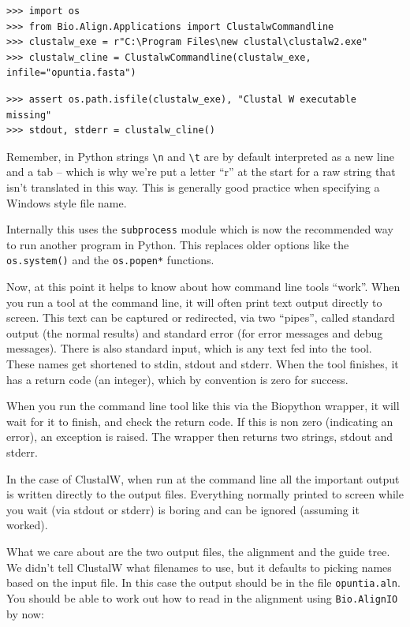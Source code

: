 \documentclass{report}
\begin{document}
\begin{verbatim}
>>> import os
>>> from Bio.Align.Applications import ClustalwCommandline
>>> clustalw_exe = r"C:\Program Files\new clustal\clustalw2.exe"
>>> clustalw_cline = ClustalwCommandline(clustalw_exe, infile="opuntia.fasta")
\end{verbatim}
\begin{verbatim}
>>> assert os.path.isfile(clustalw_exe), "Clustal W executable missing"
>>> stdout, stderr = clustalw_cline()
\end{verbatim}

\noindent Remember, in Python strings \verb|\n| and \verb|\t| are by default
interpreted as a new line and a tab -- which is why we're put a letter
``r'' at the start for a raw string that isn't translated in this way.
This is generally good practice when specifying a Windows style file name.

Internally this uses the
\verb|subprocess| module which is now the recommended way to run another
program in Python. This replaces older options like the \verb|os.system()|
and the \verb|os.popen*| functions.

Now, at this point it helps to know about how command line tools ``work''.
When you run a tool at the command line, it will often print text output
directly to screen. This text can be captured or redirected, via
two ``pipes'', called standard output (the normal results) and standard
error (for error messages and debug messages). There is also standard
input, which is any text fed into the tool. These names get shortened
to stdin, stdout and stderr. When the tool finishes, it has a return
code (an integer), which by convention is zero for success.

When you run the command line tool like this via the Biopython wrapper,
it will wait for it to finish, and check the return code. If this is
non zero (indicating an error), an exception is raised. The wrapper
then returns two strings, stdout and stderr.

In the case of ClustalW, when run at the command line all the important
output is written directly to the output files. Everything normally printed to
screen while you wait (via stdout or stderr) is boring and can be
ignored (assuming it worked).

What we care about are the two output files, the alignment and the guide
tree. We didn't tell ClustalW what filenames to use, but it defaults to
picking names based on the input file. In this case the output should be
in the file \verb|opuntia.aln|.
You should be able to work out how to read in the alignment using
\verb|Bio.AlignIO| by now:
\end{document}
